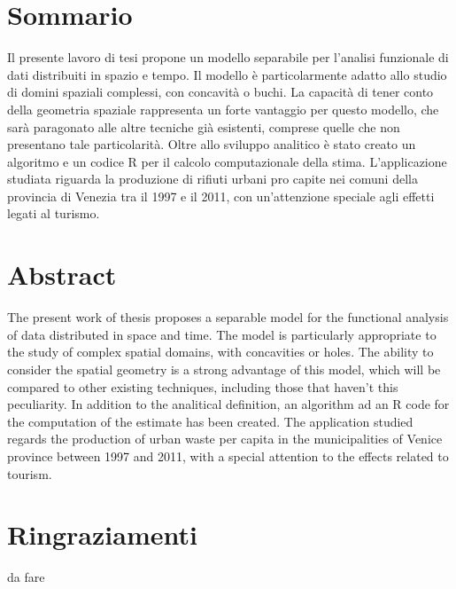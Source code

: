\documentclass[a4paper,11pt,twoside,openright]{book}							%
\begin{document}
\chapter*{Sommario}
\label{Cap:sommario}
\thispagestyle{empty}
Il presente lavoro di tesi propone un modello separabile per l'analisi funzionale di dati distribuiti in spazio e tempo. Il modello è particolarmente adatto allo studio di domini spaziali complessi, con concavità o buchi. La capacità di tener conto della geometria spaziale rappresenta un forte vantaggio per questo modello, che sarà paragonato alle altre tecniche già esistenti, comprese quelle che non presentano tale particolarità. Oltre allo sviluppo analitico è stato creato un algoritmo e un codice R per il calcolo computazionale della stima. L'applicazione studiata riguarda la produzione di rifiuti urbani pro capite nei comuni della provincia di Venezia tra il 1997 e il 2011, con un'attenzione speciale agli effetti legati al turismo.

\newpage
\thispagestyle{empty}
\chapter*{Abstract}
\label{Cap:abstract}
\thispagestyle{empty}
The present work of thesis proposes a separable model for the functional analysis of data distributed in space and time. The model is particularly appropriate to the study of complex spatial domains, with concavities or holes. The ability to consider the spatial geometry is a strong advantage of this model, which will be compared to other existing techniques, including those that haven't this peculiarity. In addition to the analitical definition, an algorithm ad an R code for the computation of the estimate has been created. The application studied regards the production of urban waste per capita in the municipalities of Venice province between 1997 and 2011, with a special attention to the effects related to tourism.
\newpage
\thispagestyle{empty}

\chapter*{Ringraziamenti}
\thispagestyle{empty}
da fare
\newpage
\thispagestyle{empty}

\frontmatter
\tableofcontents
{}
\listoffigures
{}
\listoftables
{}
\newpage
\thispagestyle{empty}
\mainmatter
\end{document}
